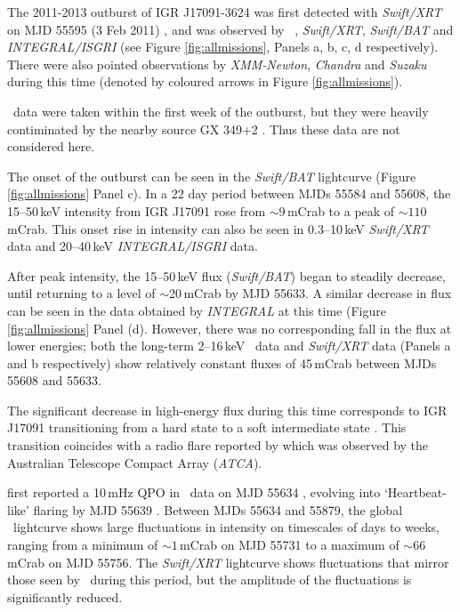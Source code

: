 \par The 2011-2013 outburst of IGR J17091-3624 was first detected with \textit{Swift/XRT} on MJD 55595 (3 Feb 2011) \citep{Krimm_IGROutburst}, and was observed by \rxte\ , \textit{Swift/XRT}, \textit{Swift/BAT} and \textit{INTEGRAL/ISGRI} (see Figure \ref{fig:allmissions}, Panels a, b, c, d respectively).  There were also pointed observations by \textit{XMM-Newton}, \textit{Chandra} and \textit{Suzaku} during this time (denoted by coloured arrows in Figure \ref{fig:allmissions}).
\par \rxte\ data were taken within the first week of the outburst, but they were heavily contiminated by the nearby source GX 349+2 \citep{Rodriguez_Contamination}.  Thus these data are not considered here.
\par The onset of the outburst can be seen in the \textit{Swift/BAT} lightcurve (Figure \ref{fig:allmissions} Panel c).  In a 22 day period between MJDs 55584 and 55608, the 15--50\,keV intensity from IGR J17091 rose from $\sim9$\,mCrab to a peak of $\sim110$\,mCrab.  This onset rise in intensity can also be seen in 0.3--10\,keV \textit{Swift/XRT} data and 20--40\,keV \textit{INTEGRAL/ISGRI} data.
\par After peak intensity, the 15--50\,keV flux (\textit{Swift/BAT}) began to steadily decrease, until returning to a level of $\sim$20\,mCrab by MJD 55633.  A similar decrease in flux can be seen in the data obtained by \textit{INTEGRAL} at this time (Figure \ref{fig:allmissions} Panel (d).  However, there was no corresponding fall in the flux at lower energies; both the long-term 2--16\,keV \rxte\ data and \textit{Swift/XRT} data (Panels a and b respectively) show relatively constant fluxes of 45\,mCrab between MJDs 55608 and 55633.
\par The significant decrease in high-energy flux during this time corresponds to IGR J17091 transitioning from a hard state to a soft intermediate state \citep{Pahari_RhoDiff}.  This transition coincides with a radio flare reported by \citet{Rodriguez_D} which was observed by the Australian Telescope Compact Array (\textit{ATCA}).
\par \citealp{Altamirano_10Hz} first reported a 10\,mHz QPO in \rxte\ data on MJD 55634 , evolving into `Heartbeat-like' flaring by MJD 55639 \citep{Altamirano_Discovery}.  Between MJDs 55634 and 55879, the global \rxte\ lightcurve shows large fluctuations in intensity on timescales of days to weeks, ranging from a minimum of $\sim1$\,mCrab on MJD 55731 to a maximum of $\sim66$\,mCrab on MJD 55756.  The \textit{Swift/XRT} lightcurve shows fluctuations that mirror those seen by \rxte\ during this period, but the amplitude of the fluctuations is significantly reduced.

